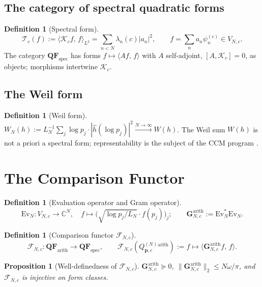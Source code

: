\documentclass[12pt,a4paper]{amsart}
\newtheorem{proposition}[theorem]{Proposition}
\theoremstyle{definition}
\newtheorem{definition}[theorem]{Definition}
\newcommand{\Kop}{\mathcal{K}_c}
\newcommand{\QM}{Q^{(N)}_{\mathbf{p},c}}
\newcommand{\psin}{\psi_n^{(c)}}
\newcommand{\norm}[1]{\|#1\|}
\newcommand{\ip}[2]{\langle #1,\, #2\rangle}
\newcommand{\Fcal}{\mathcal{F}_{N,c}}
\newcommand{\Tcal}{\mathcal{T}_c}
\newcommand{\WeilN}{W_N}
\begin{document}
\subsection{The category of spectral quadratic forms}

\begin{definition}[Spectral form]\label{def:spec_qf}
\[
  \Tcal(f) := \ip{\Kop f}{f}_{L^2}
  = \sum_{n < N}\lambda_n(c)|a_n|^2,
  \qquad f = \sum_n a_n\psin\in V_{N,c}.
\]
The category $\mathbf{QF}_{\mathrm{spec}}$ has forms
$f\mapsto\ip{Af}{f}$ with $A$ self-adjoint, $[A,\Kop]=0$,
as objects; morphisms intertwine $\Kop$.
\end{definition}

\subsection{The Weil form}

\begin{definition}[Weil form]\label{def:weil_form}
$\WeilN(h) := L_N^{-1}\sum_j \log p_j\cdot|\hat h(\log p_j)|^2
\xrightarrow{N\to\infty} W(h)$.
The Weil sum $W(h)$ is not a priori a spectral form;
representability is the subject of the CCM program \cite{CCM2025}.
\end{definition}

\section{The Comparison Functor}\label{sec:functor}

\begin{definition}[Evaluation operator and Gram operator]%
\label{def:embedding}
\[
  \mathrm{Ev}_N: V_{N,c}\to\mathbb{C}^N,
  \quad f\mapsto\bigl(\sqrt{\log p_j/L_N}\cdot f(p_j)\bigr)_j;
  \qquad
  \mathbf{G}^{\mathrm{arith}}_{N,c} := \mathrm{Ev}_N^*\mathrm{Ev}_N.
\]
\end{definition}

\begin{definition}[Comparison functor $\Fcal$]\label{def:functor}
\[
  \Fcal:\mathbf{QF}_{\mathrm{arith}}\to\mathbf{QF}_{\mathrm{spec}},
  \qquad
  \Fcal(\QM^{\mathrm{arith}}) := f\mapsto
  \ip{\mathbf{G}^{\mathrm{arith}}_{N,c}f}{f}.
\]
\end{definition}

\begin{proposition}[Well-definedness of $\Fcal$]%
\label{prop:functor_welldef}
$\mathbf{G}^{\mathrm{arith}}_{N,c}\succeq 0$,
$\norm{\mathbf{G}^{\mathrm{arith}}_{N,c}}_2\le N\omega/\pi$,
and $\Fcal$ is injective on form classes.
\end{proposition}
\end{document}
